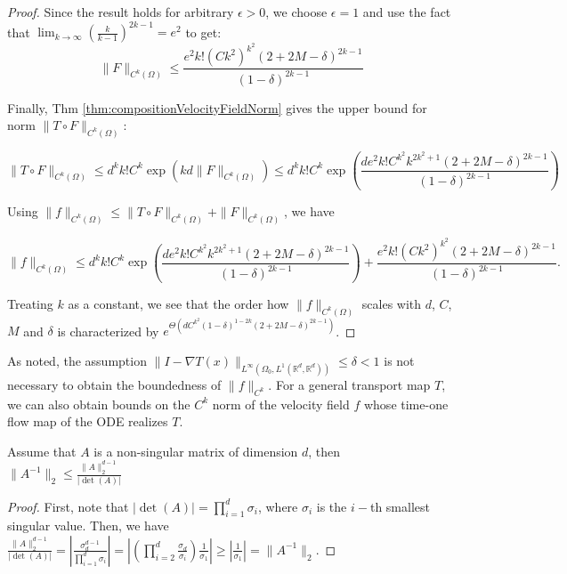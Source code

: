 \begin{proof}
Since the result holds for arbitrary $\epsilon > 0$, we choose $\epsilon = 1$ and use the fact that $\lim_{k\rightarrow\infty} (\frac{k}{k-1})^{2k-1} = e^2$ to get:
$$\|F\|_{C^k(\Omega)} \leq \frac{e^2k!(Ck^{2})^{k^2}(2+2M-\delta)^{2k-1}}{(1-\delta)^{2k-1}} $$




Finally, Thm \ref{thm:compositionVelocityFieldNorm} gives the upper bound for norm $\|T\circ F\|_{C^k(\Omega)}$:

$$\|T\circ F\|_{C^k(\Omega)} \leq  d^kk!C^k\exp\left(kd\|F\|_{C^k(\Omega)}\right) \leq  d^kk!C^k\exp\left(\frac{de^2k!C^{k^2}k^{2k^2+1}(2+2M-\delta)^{2k-1}}{(1-\delta)^{2k-1}} \right)
$$

Using $\|f\|_{C^k(\Omega)} \leq \|T\circ F\|_{C^k(\Omega)} + \|F\|_{C^k(\Omega)}$, we have


$$\|f\|_{C^k(\Omega)} \leq d^kk!C^k\exp\left(\frac{de^2k!C^{k^2}k^{2k^2+1}(2+2M-\delta)^{2k-1}}{(1-\delta)^{2k-1}} \right)
+\frac{e^2k!(Ck^{2})^{k^2}(2+2M-\delta)^{2k-1}}{(1-\delta)^{2k-1}}. $$

Treating $k$ as a constant, we see that the order how $\|f\|_{C^k(\Omega)}$ scales with $d$, $C$, $M$ and $\delta$ is characterized by $e^{\Theta(dC^{k^2}(1-\delta)^{1-2k}(2+2M-\delta)^{2k-1})}$. 

\end{proof}

As noted, the assumption $\|I - \nabla T(x)\|_{L^\infty(\Omega_0, L^1(\mathbb{R}^d,\mathbb{R}^d))} \leq \delta < 1$ is not necessary to obtain the boundedness of $\|f\|_{C^k}$. For a general transport map $T$, we can also obtain bounds on the $C^k$ norm of the velocity field $f$ whose time-one flow map of the ODE realizes $T$. 

\begin{lemma}\label{lemma:MatrixInverseNorm}
Assume that $A$ is a non-singular matrix of dimension $d$, then $\|A^{-1}\|_2\leq \frac{\|A\|_2^{d-1}}{|\det(A)|}$
\end{lemma}
\begin{proof}
First, note that $|\det(A)| = \prod_{i=1}^d\sigma_i$, where $\sigma_i$ is the $i-$th smallest singular value. Then, we have $\frac{\|A\|_2^{d-1}}{|\det(A)|} = |\frac{\sigma_d^{d-1}}{ \prod_{i=1}^d\sigma_i}| = |\left(\prod_{i=2}^d\frac{\sigma_d}{\sigma_i}\right)\frac{1}{\sigma_1}| \geq |\frac{1}{\sigma_1}| = \|A^{-1}\|_2.$
\end{proof}


